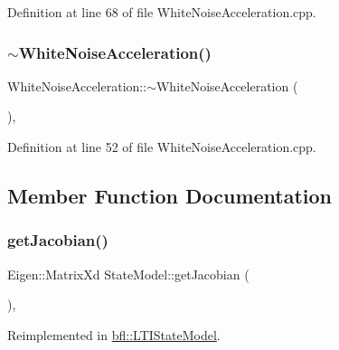 Definition at line 68 of file White\+Noise\+Acceleration.\+cpp.

\mbox{\label{classbfl_1_1WhiteNoiseAcceleration_a17d13fe4ece8cb6db9f2423ff48f817d}} 
\subsubsection{\texorpdfstring{$\sim$\+White\+Noise\+Acceleration()}{~WhiteNoiseAcceleration()}}
{\footnotesize\ttfamily White\+Noise\+Acceleration\+::$\sim$\+White\+Noise\+Acceleration (\begin{DoxyParamCaption}{ }\end{DoxyParamCaption})\hspace{0.3cm}{\ttfamily [virtual]}, {\ttfamily [noexcept]}}



Definition at line 52 of file White\+Noise\+Acceleration.\+cpp.



\subsection{Member Function Documentation}
\mbox{\label{classbfl_1_1StateModel_a78df4b39578345142fcfb18abaab2177}} 
\subsubsection{\texorpdfstring{get\+Jacobian()}{getJacobian()}}
{\footnotesize\ttfamily Eigen\+::\+Matrix\+Xd State\+Model\+::get\+Jacobian (\begin{DoxyParamCaption}{ }\end{DoxyParamCaption})\hspace{0.3cm}{\ttfamily [virtual]}, {\ttfamily [inherited]}}



Reimplemented in \mbox{\hyperlink{classbfl_1_1LTIStateModel_a5bdef1421c100bce7baa1961d2916fc3}{bfl\+::\+L\+T\+I\+State\+Model}}.



